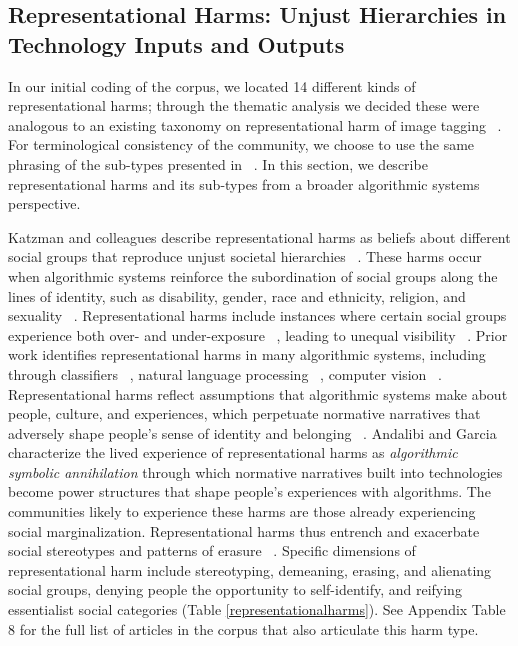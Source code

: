 \subsection{Representational Harms: Unjust Hierarchies in Technology Inputs and Outputs}
In our initial coding of the corpus, we located 14 different kinds of representational harms; through the thematic analysis we decided these were analogous to an existing taxonomy on representational harm of image tagging ~\cite{Katzman_Barocas_Blodgett_Laird_Scheuerman_Wallach_2021}. For terminological consistency of the community, we choose to use the same phrasing of the sub-types presented in ~\cite{Katzman_Barocas_Blodgett_Laird_Scheuerman_Wallach_2021}. In this section, we describe representational harms and its sub-types from a broader algorithmic systems perspective. 

Katzman and colleagues describe representational harms as beliefs about different social groups that reproduce unjust societal hierarchies ~\cite{Katzman_Barocas_Blodgett_Laird_Scheuerman_Wallach_2021}. These harms occur when algorithmic systems reinforce the subordination of social groups along the lines of identity, such as disability, gender, race and ethnicity, religion, and sexuality ~\cite{barocas-hardt-narayanan}. Representational harms include instances where certain social groups experience both over- and under-exposure ~\cite{Benjamin_2019}, leading to unequal visibility ~\cite{Yee_Tantipongpipat_Mishra_2021}. Prior work identifies representational harms in many algorithmic systems, including through classifiers ~\cite{Buolamwini_Friedler_Wilson}, natural language processing ~\cite{Blodgett_Barocas_Daume_Wallach_2020}, computer vision ~\cite{Hendricks_Burns_Saenko_Darrell_Rohrbach_2018, Zhao_Wang_Yatskar_Ordonez_Chang_2017,Bennett_Gleason_Scheuerman_Bigham_Guo_To_2021}. Representational harms reflect assumptions that algorithmic systems make about people, culture, and experiences, which perpetuate normative narratives that adversely shape people’s sense of identity and belonging ~\cite{Karizat_2021}. Andalibi and Garcia ~\cite{Andalibi_Garcia_2021} characterize the lived experience of representational harms as \textit{algorithmic symbolic annihilation} through which normative narratives built into technologies become power structures that shape people’s experiences with algorithms. The communities likely to experience these harms are those already experiencing social marginalization. Representational harms thus entrench and exacerbate social stereotypes and patterns of erasure ~\cite{Bengio_Beygelzimer_Crawford_Fromer_Gabriel_Levendowski_Raji_Ranzato_2022}. Specific dimensions of representational harm include stereotyping, demeaning, erasing, and alienating social groups, denying people the opportunity to self-identify, and reifying essentialist social categories (Table \ref{representationalharms}). See Appendix Table 8 for the full list of articles in the corpus that also articulate this harm type.

